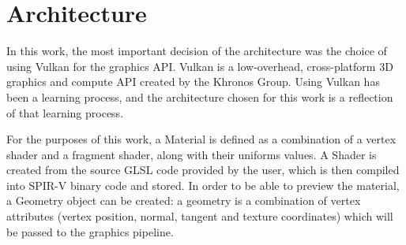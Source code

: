 \section{Architecture}
In this work, the most important decision of the architecture was the choice of using Vulkan for the graphics API. Vulkan is a low-overhead, cross-platform 3D graphics and compute API created by the Khronos Group. Using Vulkan has been a learning process, and the architecture chosen for this work is a reflection of that learning process.

For the purposes of this work, a Material is defined as a combination of a vertex shader and a fragment shader, along with their uniforms values. A Shader is created from the source GLSL code provided by the user, which is then compiled into SPIR-V binary code and stored. In order to be able to preview the material, a Geometry object can be created: a geometry is a combination of vertex attributes (vertex position, normal, tangent and texture coordinates) which will be passed to the graphics pipeline.












